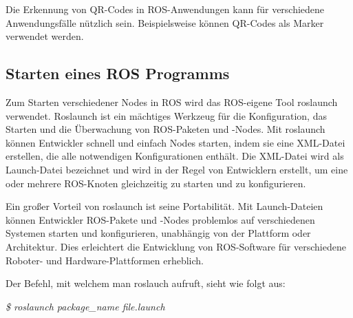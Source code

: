     Die Erkennung von QR-Codes in \ac{ROS}-Anwendungen kann für verschiedene Anwendungsfälle nützlich sein. Beispielsweise können QR-Codes als Marker verwendet werden.

    \subsection{Starten eines ROS Programms} \label{starten eines ROS Programms:subsection}
    Zum Starten verschiedener Nodes in \ac{ROS} wird das ROS-eigene Tool roslaunch verwendet. Roslaunch ist ein mächtiges Werkzeug für die Konfiguration, das Starten und die Überwachung von ROS-Paketen und -Nodes. Mit roslaunch können Entwickler schnell und einfach Nodes starten, indem sie eine XML-Datei erstellen, die alle notwendigen Konfigurationen enthält. Die XML-Datei wird als Launch-Datei bezeichnet und wird in der Regel von Entwicklern erstellt, um eine oder mehrere ROS-Knoten gleichzeitig zu starten und zu konfigurieren.

    Ein großer Vorteil von roslaunch ist seine Portabilität. Mit Launch-Dateien können Entwickler ROS-Pakete und -Nodes problemlos auf verschiedenen Systemen starten und konfigurieren, unabhängig von der Plattform oder Architektur. Dies erleichtert die Entwicklung von ROS-Software für verschiedene Roboter- und Hardware-Plattformen erheblich. \cite{roslaunch}

    Der Befehl, mit welchem man roslauch aufruft, sieht wie folgt aus:
    
    \textit{\$ roslaunch package\_name file.launch}

